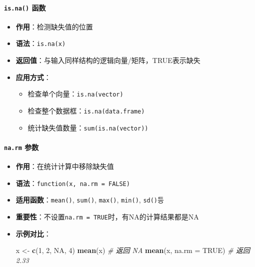 \documentclass[
]{book}
\newenvironment{Shaded}{\begin{snugshade}}{\end{snugshade}}
\newcommand{\AttributeTok}[1]{\textcolor[rgb]{0.13,0.29,0.53}{#1}}
\newcommand{\CommentTok}[1]{\textcolor[rgb]{0.56,0.35,0.01}{\textit{#1}}}
\newcommand{\ConstantTok}[1]{\textcolor[rgb]{0.56,0.35,0.01}{#1}}
\newcommand{\DecValTok}[1]{\textcolor[rgb]{0.00,0.00,0.81}{#1}}
\newcommand{\FunctionTok}[1]{\textcolor[rgb]{0.13,0.29,0.53}{\textbf{#1}}}
\newcommand{\NormalTok}[1]{#1}
\newcommand{\OtherTok}[1]{\textcolor[rgb]{0.56,0.35,0.01}{#1}}
\providecommand{\tightlist}{%
  \setlength{\itemsep}{0pt}\setlength{\parskip}{0pt}}
\begin{document}
\hypertarget{is.na-ux51fdux6570}{%
\paragraph{\texorpdfstring{\texttt{is.na()} 函数}{is.na() 函数}}\label{is.na-ux51fdux6570}}

\begin{itemize}
\tightlist
\item
  \textbf{作用}：检测缺失值的位置
\item
  \textbf{语法}：\texttt{is.na(x)}
\item
  \textbf{返回值}：与输入同样结构的逻辑向量/矩阵，TRUE表示缺失
\item
  \textbf{应用方式}：

  \begin{itemize}
  \tightlist
  \item
    检查单个向量：\texttt{is.na(vector)}
  \item
    检查整个数据框：\texttt{is.na(data.frame)}
  \item
    统计缺失值数量：\texttt{sum(is.na(vector))}
  \end{itemize}
\end{itemize}

\hypertarget{na.rm-ux53c2ux6570}{%
\paragraph{\texorpdfstring{\texttt{na.rm} 参数}{na.rm 参数}}\label{na.rm-ux53c2ux6570}}

\begin{itemize}
\item
  \textbf{作用}：在统计计算中移除缺失值
\item
  \textbf{语法}：\texttt{function(x,\ na.rm\ =\ FALSE)}
\item
  \textbf{适用函数}：\texttt{mean()}, \texttt{sum()}, \texttt{max()}, \texttt{min()}, \texttt{sd()}등
\item
  \textbf{重要性}：不设置\texttt{na.rm\ =\ TRUE}时，有NA的计算结果都是NA
\item
  \textbf{示例对比}：

\begin{Shaded}
\begin{Highlighting}[]
\NormalTok{x }\OtherTok{\textless{}{-}} \FunctionTok{c}\NormalTok{(}\DecValTok{1}\NormalTok{, }\DecValTok{2}\NormalTok{, }\ConstantTok{NA}\NormalTok{, }\DecValTok{4}\NormalTok{)}
\FunctionTok{mean}\NormalTok{(x)           }\CommentTok{\# 返回 NA}
\FunctionTok{mean}\NormalTok{(x, }\AttributeTok{na.rm =} \ConstantTok{TRUE}\NormalTok{)  }\CommentTok{\# 返回 2.33}
\end{Highlighting}
\end{Shaded}
\end{itemize}
\end{document}
